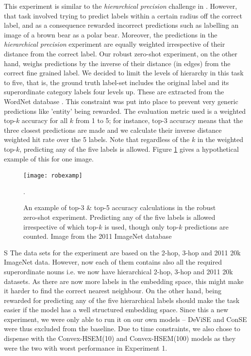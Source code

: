 \documentclass[12pt]{report}
\begin{document}
This experiment is similar to the \textit{hierarchical precision} challenge in \cite{Frome2013}. However, that task involved trying to predict labels within a certain radius off the correct label, and as a consequence rewarded incorrect predictions such as labelling an image of a brown bear as a polar bear. Moreover, the predictions in the \textit{hierarchical precision} experiment are equally weighted irrespective of their distance from the correct label. Our robust zero-shot experiment, on the other hand, weighs predictions by the inverse of their distance (in edges) from the correct fine grained label. We decided to limit the levels of hierarchy in this task to five, that is, the ground truth label-set includes the original label and its superordinate category labels four levels up. These are extracted from the WordNet database \cite{Miller1995}. This constraint was put into place to prevent very generic predictions like 'entity' being rewarded. The evaluation metric used is a weighted top-$k$ accuracy for all $k$ from 1 to 5; for instance,  top-$3$ accuracy means that the three closest predictions are made and we calculate their inverse distance weighted hit rate over the 5 labels. Note that regardless of the $k$ in the weighted top-$k$, predicting any of the five labels is allowed. Figure \ref{fig:robexp} gives a hypothetical example of this for one image. 
\begin{figure}
  \centering
  \texttt{[image: robexamp]}
  \caption{An example of top-3 \& top-5 accuracy calculations in the robust zero-shot experiment. Predicting any of the five labels is allowed irrespective of which top-$k$ is used, though only top-$k$ predictions are counted. Image from the 2011 ImageNet database \cite{JiaDeng2009}}.
  \label{fig:robexp}
\end{figure}
S
The data sets for the experiment are based on the 2-hop, 3-hop and 2011 20k ImageNet data. However, now each of them contains also all the required superordinate nouns i.e. we now have hierarchical 2-hop, 3-hop and 2011 20k datasets. As there are now more labels in the embedding space, this might make it harder to find the correct nearest neighbour. On the other hand, being rewarded for predicting any of the five hierarchical labels should make the task easier if the model has a well structured embedding space. Since this a new experiment, we were only able to run it on our own models -- DeViSE and ConSE were thus excluded from the baseline. Due to time constraints, we also chose to dispense with the Convex-HSEM(10) and Convex-HSEM(100) models as they were the two with worst performance in Experiment 1. 
\end{document}
